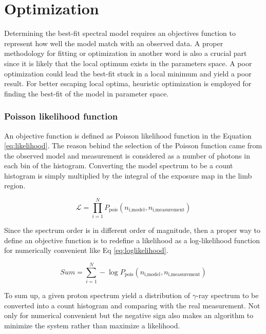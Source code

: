
\section{Optimization}
Determining the best-fit spectral model requires an objectives function
to represent how well the model match with an observed data. A proper 
methodology for fitting or optimization in another word is also 
a crucial part since it is likely that the local optimum exists in the parameters space. A poor optimization could lead the best-fit
stuck in a local minimum and yield a poor result. For better escaping 
local optima, heuristic optimization is employed for finding the 
best-fit of the model in parameter space.


\subsubsection{Poisson likelihood function}
An objective function is defined as Poisson likelihood function 
in the Equation \ref{eq:likelihood}. The reason behind the selection 
of the Poisson function came from the observed model and measurement is 
considered as a number of photons in each bin of the histogram. 
Converting the model spectrum to be a count histogram is simply
multiplied by the integral of the exposure map in the limb region.

\begin{equation}
    \mathcal{L} = \prod_{i=1}^{N} P_{\text{pois}}(n_{\text{i,model}}, n_{\text{i,measurement}})
    \label{eq:likelihood}
\end{equation}

Since the spectrum order is in different order of magnitude, then a
proper way to define an objective function is to redefine a
likelihood as a log-likelihood function for numerically
convenient like Eq \ref{eq:loglikelihood}. 

\begin{equation}
    Sum = \sum_{i=1}^{N} -\log P_{\text{pois}}(n_{\text{i,model}}, n_{\text{i,measurement}})
    \label{eq:loglikelihood}
\end{equation}

To sum up, a given proton spectrum yield a distribution of $\gamma$-ray
spectrum to be converted into a count histogram and comparing with the 
real measurement. Not only for numerical convenient but the negative sign 
also makes an algorithm to minimize the system rather than maximize 
a likelihood.

